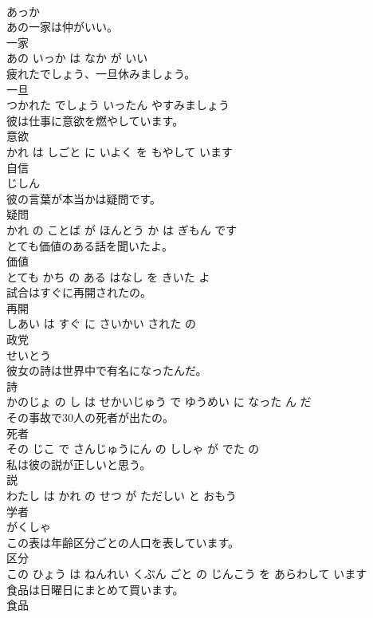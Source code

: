 \documentclass[8pt]{extreport}
\begin{document}
\begin{CJK}{UTF8}{min}
\\	あっか		
\\	あの一家は仲がいい。	
\\	一家 
\\	あの いっか は なか が いい		
\\	疲れたでしょう、一旦休みましょう。	
\\	一旦 
\\	つかれた でしょう いったん やすみましょう		
\\	彼は仕事に意欲を燃やしています。	
\\	意欲 
\\	かれ は しごと に いよく を もやして います		
\\	自信	
\\	じしん		
\\	彼の言葉が本当かは疑問です。	
\\	疑問 
\\	かれ の ことば が ほんとう か は ぎもん です		
\\	とても価値のある話を聞いたよ。	
\\	価値 
\\	とても かち の ある はなし を きいた よ		
\\	試合はすぐに再開されたの。	
\\	再開 
\\	しあい は すぐ に さいかい された の		
\\	政党	
\\	せいとう		
\\	彼女の詩は世界中で有名になったんだ。	
\\	詩 
\\	かのじょ の し は せかいじゅう で ゆうめい に なった ん だ		
\\	その事故で30人の死者が出たの。	
\\	死者 
\\	その じこ で さんじゅうにん の ししゃ が でた の		
\\	私は彼の説が正しいと思う。	
\\	説 
\\	わたし は かれ の せつ が ただしい と おもう		
\\	学者	
\\	がくしゃ		
\\	この表は年齢区分ごとの人口を表しています。	
\\	区分 
\\	この ひょう は ねんれい くぶん ごと の じんこう を あらわして います		
\\	食品は日曜日にまとめて買います。	
\\	食品 

\end{CJK}
\end{document}
